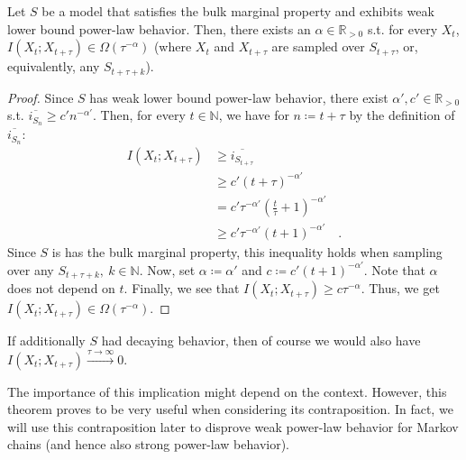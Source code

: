 \documentclass[../../main.tex]{subfiles}
\begin{document}
    \begin{theorem}
        \label{theorem:power_law_decay_in_well-behaved_models_with_weak_power-law_behavior}
        Let $S$ be a model that satisfies the bulk marginal property and exhibits weak lower bound power-law behavior. Then, there exists an $\alpha \in \mathbb{R}_{>0}$ s.t. for every $X_t$, $I(X_{t}; X_{t + \tau}) \in \Omega(\tau^{-\alpha})$ (where $X_t$ and $X_{t + \tau}$ are sampled over $S_{t + \tau}$, or, equivalently, any $S_{t + \tau + k}$).
    \end{theorem}
    \vspace{-2.5em}
    \begin{proof}
        Since $S$ has weak lower bound power-law behavior, there exist $\alpha', c' \in \mathbb{R}_{>0}$ s.t. $\overline{i_{S_n}} \geq c' n^{-\alpha'}$. Then, for every $t \in \mathbb{N}$, we have for $n \coloneqq t + \tau$ by the definition of $\overline{i_{S_n}}$:
        \begin{align*}
            I(X_{t}; X_{t + \tau}) &\geq \overline{i_{S_{t + \tau}}} \\
            &\geq c' (t + \tau)^{-\alpha'} \\
            &= c' \tau^{-\alpha'} (\frac{t}{\tau} + 1)^{-\alpha'} \\
            &\geq c' \tau^{-\alpha'} (t + 1)^{-\alpha'} \quad .
        \end{align*}
        Since $S$ is has the bulk marginal property, this inequality holds when sampling over any $S_{t + \tau + k}, \ k \in \mathbb{N}$. Now, set $\alpha \coloneqq \alpha'$ and $c \coloneqq c' (t + 1)^{-\alpha'}$. Note that $\alpha$ does not depend on $t$. Finally, we see that $I(X_{t}; X_{t + \tau}) \geq c \tau^{-\alpha}$. Thus, we get $I(X_{t}; X_{t + \tau}) \in \Omega(\tau^{-\alpha})$.
    \end{proof}

    \begin{remark}
        If additionally $S$ had decaying behavior, then of course we would also have $I(X_{t}; X_{t + \tau}) \xrightarrow{\tau \to \infty} 0$.
    \end{remark}

    \begin{remark}
        The importance of this implication might depend on the context. However, this theorem proves to be very useful when considering its contraposition. In fact, we will use this contraposition later to disprove weak power-law behavior for Markov chains (and hence also strong power-law behavior).
    \end{remark}
\end{document}
